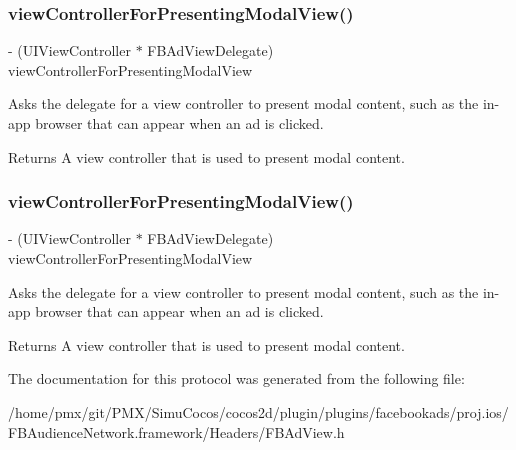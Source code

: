\subsubsection{\texorpdfstring{view\+Controller\+For\+Presenting\+Modal\+View()}{viewControllerForPresentingModalView()}\hspace{0.1cm}{\footnotesize\ttfamily [4/5]}}
{\footnotesize\ttfamily -\/ (U\+I\+View\+Controller $\ast$ F\+B\+Ad\+View\+Delegate) view\+Controller\+For\+Presenting\+Modal\+View \begin{DoxyParamCaption}{ }\end{DoxyParamCaption}\hspace{0.3cm}{\ttfamily [optional]}}

Asks the delegate for a view controller to present modal content, such as the in-\/app browser that can appear when an ad is clicked.

\begin{DoxyReturn}{Returns}
A view controller that is used to present modal content. 
\end{DoxyReturn}
\mbox{\label{protocolFBAdViewDelegate_01-p_abb65fb95527f0571d4a298beb1e6e299}} 
\subsubsection{\texorpdfstring{view\+Controller\+For\+Presenting\+Modal\+View()}{viewControllerForPresentingModalView()}\hspace{0.1cm}{\footnotesize\ttfamily [5/5]}}
{\footnotesize\ttfamily -\/ (U\+I\+View\+Controller $\ast$ F\+B\+Ad\+View\+Delegate) view\+Controller\+For\+Presenting\+Modal\+View \begin{DoxyParamCaption}{ }\end{DoxyParamCaption}\hspace{0.3cm}{\ttfamily [optional]}}

Asks the delegate for a view controller to present modal content, such as the in-\/app browser that can appear when an ad is clicked.

\begin{DoxyReturn}{Returns}
A view controller that is used to present modal content. 
\end{DoxyReturn}


The documentation for this protocol was generated from the following file\+:\begin{DoxyCompactItemize}
\item 
/home/pmx/git/\+P\+M\+X/\+Simu\+Cocos/cocos2d/plugin/plugins/facebookads/proj.\+ios/\+F\+B\+Audience\+Network.\+framework/\+Headers/F\+B\+Ad\+View.\+h\end{DoxyCompactItemize}
